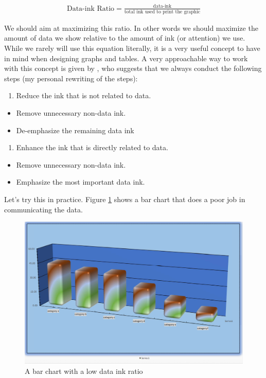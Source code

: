 \documentclass[]{book}
\providecommand{\tightlist}{%
  \setlength{\itemsep}{0pt}\setlength{\parskip}{0pt}}
\begin{document}
\begin{align}
  \text{Data-ink Ratio}=\frac{\text{data-ink}}{\text{total ink used to print the graphic}}
\end{align}

We should aim at maximizing this ratio. In other words we should maximize the amount of data we show relative to the amount of ink (or attention) we use. While we rarely will use this equation literally, it is a very useful concept to have in mind when designing graphs and tables. A very approachable way to work with this concept is given by \citep{few2012show}, who suggests that we always conduct the following steps (my personal rewriting of the steps):

\begin{enumerate}
\def\labelenumi{\arabic{enumi}.}
\tightlist
\item
  Reduce the ink that is not related to data.
\end{enumerate}

\begin{itemize}
\tightlist
\item
  Remove unnecessary non-data ink.
\item
  De-emphasize the remaining data ink
\end{itemize}

\begin{enumerate}
\def\labelenumi{\arabic{enumi}.}
\setcounter{enumi}{1}
\tightlist
\item
  Enhance the ink that is directly related to data.
\end{enumerate}

\begin{itemize}
\tightlist
\item
  Remove unnecessary non-data ink.
\item
  Emphasize the most important data ink.
\end{itemize}

Let's try this in practice. Figure \ref{fig:viz12} shows a bar chart that does a poor job in communicating the data.

\begin{figure}

{\centering \includegraphics[width=0.7\linewidth]{_resources/chapter_viz/ex0_1} 

}

\caption{A bar chart with a low data ink ratio}\label{fig:viz12}
\end{figure}
\end{document}
